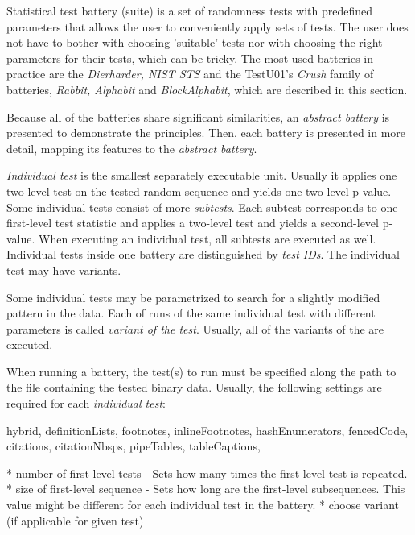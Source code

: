 \documentclass[
  digital,     %
  oneside,     %
  nosansbold,  %
  nocolorbold, %
  nolof,         %
  nolot,         %
]{fithesis4}
\begin{document}

Statistical test battery (suite) is a set of randomness tests with predefined parameters that allows the user to conveniently apply sets of tests. The user does not have to bother with choosing 'suitable' tests nor with choosing the right parameters for their tests, which can be tricky. The most used batteries in practice are the \emph{Dierharder, NIST STS} and the TestU01's \emph{Crush} family of batteries, \emph{Rabbit, Alphabit} and \emph{BlockAlphabit}, which are described in this section.

Because all of the batteries share significant similarities, an \emph{abstract battery} is presented to demonstrate the principles. Then, each battery is presented in more detail, mapping its features to the \emph{abstract battery}.

\emph{Individual test} is the smallest separately executable unit. Usually it applies one two-level test on the tested random sequence and yields one two-level p-value. Some individual tests consist of more \emph{subtests}. Each subtest corresponds to one first-level test statistic and applies a two-level test and yields a second-level p-value. When executing an individual test, all subtests are executed as well. Individual tests inside one battery are distinguished by \emph{test IDs}. The individual test may have variants. %

Some individual tests may be parametrized to search for a slightly modified pattern in the data. Each of runs of the same individual test with different parameters is called \emph{variant of the test}. Usually, all of the variants of the are executed.

When running a battery, the test(s) to run must be specified along the path to the file containing the tested binary data. Usually, the following settings are required for each \emph{individual test}:
\begin{markdown*}{%
  hybrid,
  definitionLists,
  footnotes,
  inlineFootnotes,
  hashEnumerators,
  fencedCode,
  citations,
  citationNbsps,
  pipeTables,
  tableCaptions,
}

* number of first-level tests - Sets how many times the first-level test is repeated.
* size of first-level sequence - Sets how long are the first-level subsequences. This value might be different for each individual test in the battery.
* choose variant (if applicable for given test) 


\end{markdown*}
\end{document}
